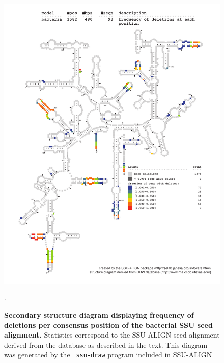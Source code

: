 \begin{figure}
\begin{center}
\includegraphics[width=5.64in]{Figures/bacteria-0p1-dall}
\end{center}
\caption[Secondary structure diagram displaying frequency of deletions
  per consensus position of the bacterial SSU seed
  alignment]{\textbf{Secondary structure diagram displaying frequency 
  of deletions per consensus position of the bacterial SSU seed
  alignment.} Statistics correspond to the SSU-ALIGN seed
  alignment derived from the  database \cite{CannoneGutell02}
  as described in the text. This diagram was generated by the {\tt
  ssu-draw} program included in SSU-ALIGN}.
\label{fig:bacdel}
\end{figure}

\newpage 

